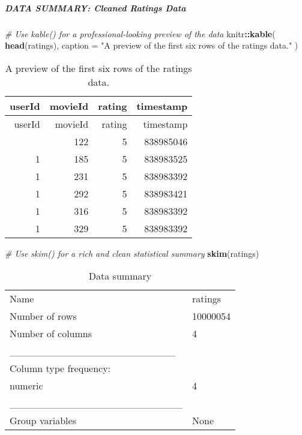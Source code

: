 \documentclass[
]{article}
\newenvironment{Shaded}{\begin{snugshade}}{\end{snugshade}}
\newcommand{\AttributeTok}[1]{\textcolor[rgb]{0.13,0.29,0.53}{#1}}
\newcommand{\CommentTok}[1]{\textcolor[rgb]{0.56,0.35,0.01}{\textit{#1}}}
\newcommand{\FunctionTok}[1]{\textcolor[rgb]{0.13,0.29,0.53}{\textbf{#1}}}
\newcommand{\NormalTok}[1]{#1}
\newcommand{\SpecialCharTok}[1]{\textcolor[rgb]{0.81,0.36,0.00}{\textbf{#1}}}
\newcommand{\StringTok}[1]{\textcolor[rgb]{0.31,0.60,0.02}{#1}}
\begin{document}
\subparagraph{DATA SUMMARY: Cleaned Ratings
Data}\label{data-summary-cleaned-ratings-data}

\begin{Shaded}
\begin{Highlighting}[]
\CommentTok{\# Use kable() for a professional{-}looking preview of the data}
\NormalTok{knitr}\SpecialCharTok{::}\FunctionTok{kable}\NormalTok{(}
  \FunctionTok{head}\NormalTok{(ratings), }
  \AttributeTok{caption =} \StringTok{"A preview of the first six rows of the ratings data."}
\NormalTok{)}
\end{Highlighting}
\end{Shaded}

\begin{longtable}[]{@{}rrrr@{}}
\caption{A preview of the first six rows of the ratings
data.}\tabularnewline
\toprule\noalign{}
userId & movieId & rating & timestamp \\
\midrule\noalign{}
\endfirsthead
\toprule\noalign{}
userId & movieId & rating & timestamp \\
\midrule\noalign{}
\endhead
\bottomrule\noalign{}
\endlastfoot
1 & 122 & 5 & 838985046 \\
1 & 185 & 5 & 838983525 \\
1 & 231 & 5 & 838983392 \\
1 & 292 & 5 & 838983421 \\
1 & 316 & 5 & 838983392 \\
1 & 329 & 5 & 838983392 \\
\end{longtable}

\begin{Shaded}
\begin{Highlighting}[]
\CommentTok{\# Use skim() for a rich and clean statistical summary}
\FunctionTok{skim}\NormalTok{(ratings)}
\end{Highlighting}
\end{Shaded}

\begin{longtable}[]{@{}ll@{}}
\caption{Data summary}\tabularnewline
\toprule\noalign{}
\endfirsthead
\endhead
\bottomrule\noalign{}
\endlastfoot
Name & ratings \\
Number of rows & 10000054 \\
Number of columns & 4 \\
\_\_\_\_\_\_\_\_\_\_\_\_\_\_\_\_\_\_\_\_\_\_\_ & \\
Column type frequency: & \\
numeric & 4 \\
\_\_\_\_\_\_\_\_\_\_\_\_\_\_\_\_\_\_\_\_\_\_\_\_ & \\
Group variables & None \\
\end{longtable}
\end{document}
